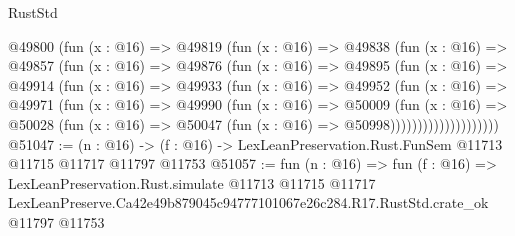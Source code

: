 \begin{lexlean}{RustStd}
\begin{coremodule}
              @49800
                (fun (x : @16) =>
                @49819
                  (fun (x : @16) =>
                  @49838
                    (fun (x : @16) =>
                    @49857
                      (fun (x : @16) =>
                      @49876
                        (fun (x : @16) =>
                        @49895
                          (fun (x : @16) =>
                          @49914
                            (fun (x : @16) =>
                            @49933
                              (fun (x : @16) =>
                              @49952
                                (fun (x : @16) =>
                                @49971
                                  (fun (x : @16) =>
                                  @49990
                                    (fun (x : @16) =>
                                    @50009
                                      (fun (x : @16) =>
                                      @50028
                                        (fun (x : @16) =>
                                        @50047 (fun (x : @16) => @50998))))))))))))))))))))
@51047 := (n : @16) ->
  (f : @16) -> LexLeanPreservation.Rust.FunSem @11713 @11715 @11717 @11797 @11753
@51057 := fun (n : @16) =>
  fun (f : @16) =>
  LexLeanPreservation.Rust.simulate
    @11713
    @11715
    @11717
    LexLeanPreserve.Ca42e49b879045c94777101067e26c284.R17.RustStd.crate_ok
    @11797
    @11753
\end{coremodule}
\end{lexlean}

